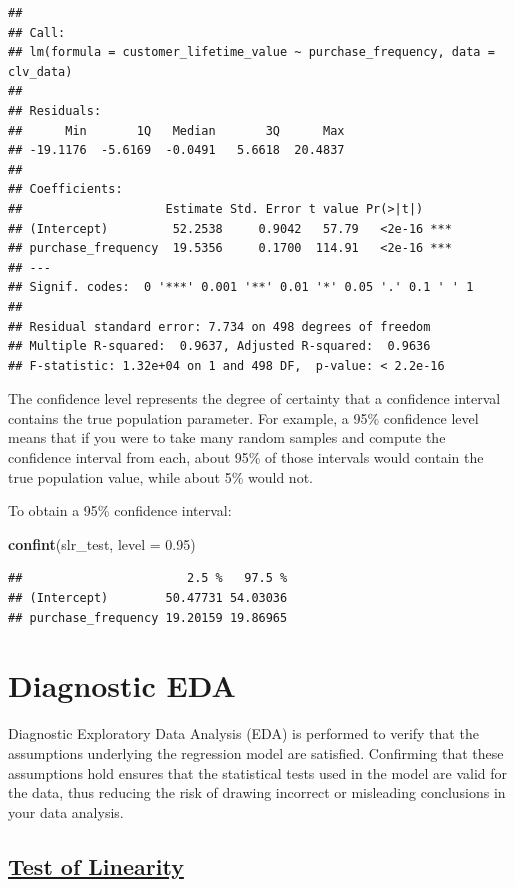 \documentclass[
]{article}
\newenvironment{Shaded}{\begin{snugshade}}{\end{snugshade}}
\newcommand{\AttributeTok}[1]{\textcolor[rgb]{0.13,0.29,0.53}{#1}}
\newcommand{\FloatTok}[1]{\textcolor[rgb]{0.00,0.00,0.81}{#1}}
\newcommand{\FunctionTok}[1]{\textcolor[rgb]{0.13,0.29,0.53}{\textbf{#1}}}
\newcommand{\NormalTok}[1]{#1}
\begin{document}
\begin{verbatim}
## 
## Call:
## lm(formula = customer_lifetime_value ~ purchase_frequency, data = clv_data)
## 
## Residuals:
##      Min       1Q   Median       3Q      Max 
## -19.1176  -5.6169  -0.0491   5.6618  20.4837 
## 
## Coefficients:
##                    Estimate Std. Error t value Pr(>|t|)    
## (Intercept)         52.2538     0.9042   57.79   <2e-16 ***
## purchase_frequency  19.5356     0.1700  114.91   <2e-16 ***
## ---
## Signif. codes:  0 '***' 0.001 '**' 0.01 '*' 0.05 '.' 0.1 ' ' 1
## 
## Residual standard error: 7.734 on 498 degrees of freedom
## Multiple R-squared:  0.9637, Adjusted R-squared:  0.9636 
## F-statistic: 1.32e+04 on 1 and 498 DF,  p-value: < 2.2e-16
\end{verbatim}

The confidence level represents the degree of certainty that a
confidence interval contains the true population parameter. For example,
a 95\% confidence level means that if you were to take many random
samples and compute the confidence interval from each, about 95\% of
those intervals would contain the true population value, while about 5\%
would not.

To obtain a 95\% confidence interval:

\begin{Shaded}
\begin{Highlighting}[]
\FunctionTok{confint}\NormalTok{(slr\_test, }\AttributeTok{level =} \FloatTok{0.95}\NormalTok{)}
\end{Highlighting}
\end{Shaded}

\begin{verbatim}
##                       2.5 %   97.5 %
## (Intercept)        50.47731 54.03036
## purchase_frequency 19.20159 19.86965
\end{verbatim}

\section{Diagnostic EDA}\label{diagnostic-eda}

Diagnostic Exploratory Data Analysis (EDA) is performed to verify that
the assumptions underlying the regression model are satisfied.
Confirming that these assumptions hold ensures that the statistical
tests used in the model are valid for the data, thus reducing the risk
of drawing incorrect or misleading conclusions in your data analysis.

\subsection{\texorpdfstring{\ul{\textbf{Test of
Linearity}}}{Test of Linearity}}\label{test-of-linearity}
\end{document}
